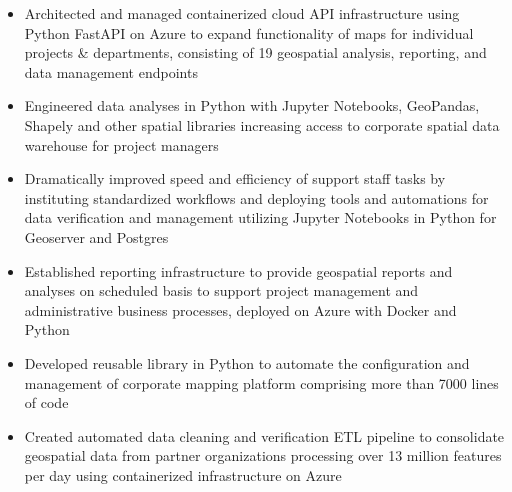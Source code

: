 \documentclass[letterpaper]{article}
\newenvironment{jobtasklist}
        {
            \vspace{-12pt}
            \begin{itemize} \itemsep 0pt
        }{
            \end{itemize}
            \vspace{-3pt}
        }
\begin{document}
\begin{jobtasklist}
    \item Architected and managed containerized cloud API infrastructure using
        Python FastAPI on Azure to expand functionality of maps for
        individual projects \& departments, consisting of 19 geospatial analysis,
        reporting, and data management endpoints

    \item Engineered data analyses in Python with Jupyter Notebooks, GeoPandas, Shapely
            and other spatial libraries
            increasing access to corporate spatial data warehouse for project managers

%

    \item Dramatically improved speed and efficiency of support staff tasks
            by instituting standardized workflows and
            deploying tools and automations for data verification and management
            utilizing Jupyter Notebooks in Python for Geoserver and Postgres

    \item Established reporting infrastructure
            to provide geospatial reports and analyses on
            scheduled basis to support project management and administrative business processes,
            deployed on Azure with Docker and Python

    \item Developed reusable library in Python to automate the configuration and management of
            corporate mapping platform comprising more than 7000 lines of code

    \item Created automated data cleaning and verification ETL pipeline to consolidate geospatial data
            from partner organizations processing over 13 million features per day
            using containerized infrastructure on Azure


\end{jobtasklist}
\end{document}
